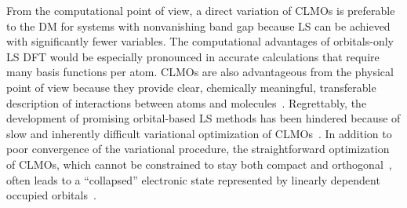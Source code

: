 \documentclass[10pt,amsmath,twocolumn,aps,prl,superscriptaddress,floatfix]{revtex4-1}
\begin{document}
From the computational point of view, a direct variation of CLMOs is preferable to the DM for systems with nonvanishing band gap because LS can be achieved with significantly fewer variables. 
The computational advantages of orbitals-only LS DFT would be especially pronounced in accurate calculations that require many basis functions per atom. 
CLMOs are also advantageous from the physical point of view because they provide clear, chemically meaningful, transferable description of interactions between atoms and molecules~\cite{stoll1980use, mo2000energy, khaliullin2007unravelling, khaliullin2013microscopic, mo2014block}. 
Regrettably, the development of promising orbital-based LS methods has been hindered because of slow and inherently difficult variational optimization of CLMOs~\cite{mauri1993orbital, ordejon1995linear, goedecker1999linear, fattebert2004linear, peng2013effective, tsuchida2008ab, peng2013effective}. 
%
%
In addition to poor convergence of the variational procedure, the straightforward optimization of CLMOs, which cannot be constrained to stay both compact and orthogonal~\cite{stoll1980use}, often leads to a ``collapsed'' electronic state represented by linearly dependent occupied orbitals~\cite{ordejon1995linear}. 
\end{document}
